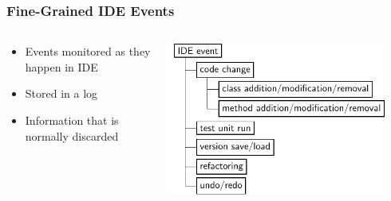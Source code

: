 \documentclass[aspectratio=169]{beamer}
\begin{document}
\begin{frame}[fragile]

\frametitle{Fine-Grained IDE Events}

\begin{columns}

\begin{column}{0.5\textwidth}

\begin{itemize}
\item Events monitored as they happen in IDE
\item Stored in a log
\item Information that is normally discarded
\end{itemize}
\end{column}

\begin{column}{0.5\textwidth}

\begin{center}
\includegraphics[width=0.9\textwidth]{img/events_model_diagram.pdf}\end{center}

\end{column}

\end{columns}

\end{frame}
\end{document}
